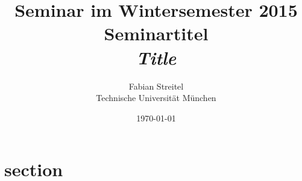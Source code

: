 \documentclass[german]{article}
\author{Fabian Streitel \\ Technische Universität München}
\title{Seminar im Wintersemester 2015 \\
Seminartitel \\
\textit{Title}}
\date{\today} %
\begin{document}
\maketitle{}

\begin{abstract}

\end{abstract}

\section{section}


{}
\end{document}
